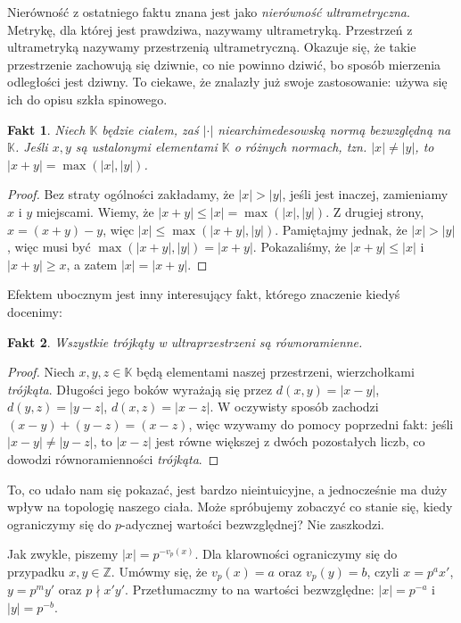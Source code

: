 \documentclass[a4paper,fleqn]{article}
\newtheorem{fkt}{Fakt}
\begin{document}
\begin{multicols}{2}
Nierówność z ostatniego faktu znana jest jako \emph{nierówność ultrametryczna}. Metrykę, dla której jest prawdziwa, nazywamy ultrametryką. Przestrzeń z ultrametryką nazywamy przestrzenią ultrametryczną. Okazuje się, że takie przestrzenie zachowują się dziwnie, co nie powinno dziwić, bo sposób mierzenia odległości jest dziwny. To ciekawe, że znalazły już swoje zastosowanie: używa się ich do opisu szkła spinowego.

\begin{fkt}Niech $\mathbb K$ będzie ciałem, zaś $|\cdot|$ niearchimedesowską normą bezwzględną na $\mathbb K$. Jeśli $x,y$ są ustalonymi elementami $\mathbb K$ o różnych normach, tzn. $|x| \neq |y|$, to $|x+y| = \max(|x|, |y|)$.\end{fkt}

\begin{proof}Bez straty ogólności zakładamy, że $|x| > |y|$, jeśli jest inaczej, zamieniamy $x$ i $y$ miejscami. Wiemy, że $|x+y| \le |x| = \max(|x|, |y|)$. Z drugiej strony, $x = (x+y) - y$, więc $|x| \le \max(|x+y|, |y|)$. Pamiętajmy jednak, że $|x| > |y|$, więc musi być $\max(|x+y|, |y|) = |x+y|$. Pokazaliśmy, że $|x+y| \le |x|$ i $|x+y| \ge x$, a zatem $|x| = |x+y|$.\end{proof}

Efektem ubocznym jest inny interesujący fakt, którego znaczenie kiedyś docenimy:

\begin{fkt}Wszystkie \emph{trójkąty} w ultraprzestrzeni są równoramienne.\end{fkt}

\begin{proof}Niech $x,y,z\in\mathbb K$ będą elementami naszej przestrzeni, wierzchołkami \emph{trójkąta}. Długości jego boków wyrażają się przez $d(x,y) = |x-y|$, $d(y,z) = |y-z|$, $d(x,z) = |x-z|$. W oczywisty sposób zachodzi $(x-y) + (y-z) = (x-z)$, więc wzywamy do pomocy poprzedni fakt: jeśli $|x-y| \neq |y-z|$, to $|x-z|$ jest równe większej z dwóch pozostałych liczb, co dowodzi równoramienności \emph{trójkąta}.  \end{proof}

To, co udało nam się pokazać, jest bardzo nieintuicyjne, a jednocześnie ma duży wpływ na topologię naszego ciała. Może spróbujemy zobaczyć co stanie się, kiedy ograniczymy się do $p$-adycznej wartości bezwzględnej? Nie zaszkodzi.

Jak zwykle, piszemy $|x| = p^{-v_p(x)}$. Dla klarowności ograniczymy się do przypadku $x,y\in\mathbb Z$. Umówmy się, że $v_p(x) = a$ oraz $v_p(y)= b$, czyli $x = p^a x'$, $y = p^m y'$ oraz $p\nmid x'y'$. Przetłumaczmy to na wartości bezwzględne: $|x| = p^{-a}$ i $|y| = p^{-b}$. 


\end{multicols}
\end{document}
